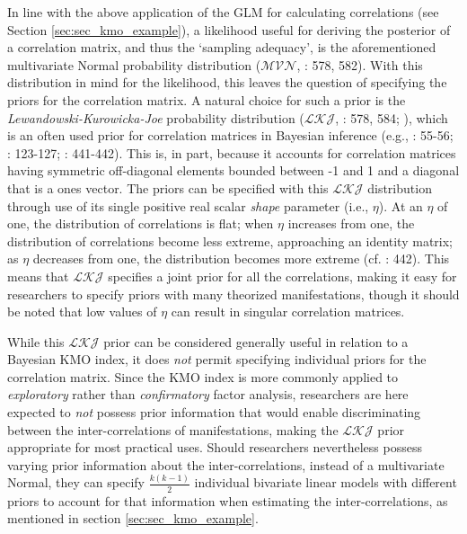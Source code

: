 \documentclass[
  10pt,
  a4paper,
  twoside]{article}
\begin{document}
In line with the above application of the GLM for calculating correlations (see Section \ref{sec:sec_kmo_example}), a likelihood useful for deriving the posterior of a correlation matrix, and thus the `sampling adequacy', is the aforementioned multivariate Normal probability distribution (\(\mathcal{MVN}\), : 578, 582). With this distribution in mind for the likelihood, this leaves the question of specifying the priors for the correlation matrix. A natural choice for such a prior is the \emph{Lewandowski-Kurowicka-Joe} probability distribution (\(\mathcal{LKJ}\), : 578, 584; ), which is an often used prior for correlation matrices in Bayesian inference (e.g., : 55-56; : 123-127; : 441-442). This is, in part, because it accounts for correlation matrices having symmetric off-diagonal elements bounded between -1 and 1 and a diagonal that is a ones vector. The priors can be specified with this \(\mathcal{LKJ}\) distribution through use of its single positive real scalar \emph{shape} parameter (i.e., \(\eta\)). At an \(\eta\) of one, the distribution of correlations is flat; when \(\eta\) increases from one, the distribution of correlations become less extreme, approaching an identity matrix; as \(\eta\) decreases from one, the distribution becomes more extreme (cf. : 442). This means that \(\mathcal{LKJ}\) specifies a joint prior for all the correlations, making it easy for researchers to specify priors with many theorized manifestations, though it should be noted that low values of \(\eta\) can result in singular correlation matrices.

While this \(\mathcal{LKJ}\) prior can be considered generally useful in relation to a Bayesian KMO index, it does \emph{not} permit specifying individual priors for the correlation matrix. Since the KMO index is more commonly applied to \emph{exploratory} rather than \emph{confirmatory} factor analysis, researchers are here expected to \emph{not} possess prior information that would enable discriminating between the inter-correlations of manifestations, making the \(\mathcal{LKJ}\) prior appropriate for most practical uses. Should researchers nevertheless possess varying prior information about the inter-correlations, instead of a multivariate Normal, they can specify \(\frac{k(k-1)}{2}\) individual bivariate linear models with different priors to account for that information when estimating the inter-correlations, as mentioned in section \ref{sec:sec_kmo_example}.
\end{document}
